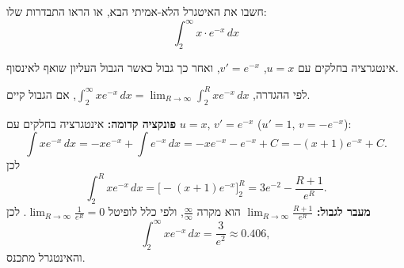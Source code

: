 
\begin{question}
חשבו את האיטגרל הלא-אמיתי הבא, או הראו התבדרות שלו:
\[ \int_2^\infty x\cdot e^{-x}\,dx \]
\end{question}

\begin{hint}
אינטגרציה בחלקים עם $u=x$, $v'=e^{-x}$, ואחר כך גבול כאשר הגבול העליון שואף לאינסוף.
\end{hint}

\begin{solution}
לפי ההגדרה, $\int_2^\infty xe^{-x}\,dx=\lim_{R\to\infty}\int_2^Rxe^{-x}\,dx$, אם הגבול קיים.

\textbf{פונקציה קדומה:} אינטגרציה בחלקים עם $u=x$, $v'=e^{-x}$ ($u'=1$, $v=-e^{-x}$):
\[ \int xe^{-x}\,dx=-xe^{-x}+\int e^{-x}\,dx=-xe^{-x}-e^{-x}+C=-(x+1)e^{-x}+C. \]
לכן
\[ \int_2^Rxe^{-x}\,dx=\Big[-(x+1)e^{-x}\Big]_2^R=3e^{-2}-\frac{R+1}{e^R}. \]
\textbf{מעבר לגבול:} $\lim_{R\to\infty}\frac{R+1}{e^R}$ הוא מקרה $\frac\infty\infty$, ולפי כלל לופיטל $\lim_{R\to\infty}\frac{1}{e^R}=0$. לכן
\[ \int_2^\infty xe^{-x}\,dx=\boxed{\frac{3}{e^2}}\approx0.406, \]
והאינטגרל מתכנס.
\end{solution}
